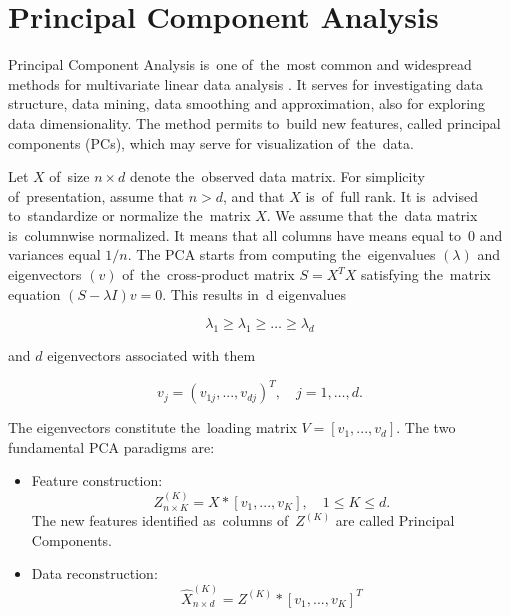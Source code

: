 
\section{Principal Component Analysis}\label{app_pca}


Principal Component Analysis is~one of~the~most common and widespread methods for multivariate linear data analysis \cite{moore1981principal,krzanowski2000principles,zimroz2013two}. It serves for investigating data structure, data mining, data smoothing and approximation, also for exploring data dimensionality. The method permits to~build new features, called principal components (PCs), which may serve for visualization of~the~data.

Let $X$ of~size $n × d$ denote the~observed data matrix. For simplicity of~presentation, assume that $n > d$, and that $X$ is~of~full rank. It is~advised to~standardize or normalize the~matrix $X$. We assume that the~data matrix is~columnwise normalized. It means that all columns have means equal to~0 and variances equal $1/n$. The PCA starts from computing the~eigenvalues $(\lambda)$ and eigenvectors $(v)$ of~the~cross-product matrix $S = X^TX$ satisfying the~matrix equation $(S − \lambda I)v = 0$. This results in~d eigenvalues

\begin{equation}
  \lambda_1 \geq \lambda_1 \geq \dots \geq \lambda_d 
\end{equation}

and $d$ eigenvectors associated with them

\begin{equation}
  v_j = \left(v_{1j} ,...,v_{dj} \right)^T, \quad j = 1,\dots,d.
\end{equation}

The eigenvectors constitute the~loading matrix $V = [v_1, . . . , v_d]$. The two fundamental PCA paradigms are:
\begin{itemize}
  \item Feature construction:
    \begin{equation}
      Z_{n×K}^{(K)} = X * [v_1,...,v_K], \quad 1 \leq K \leq d.
    \end{equation}
    The new features identified as~columns of~$Z^{(K)}$ are called Principal Components.
  \item Data reconstruction:
    \begin{equation}
      \hat{X}_{n×d}^{(K)} = Z^{(K)} * [v_1,...,v_K]^T
    \end{equation}
\end{itemize}


